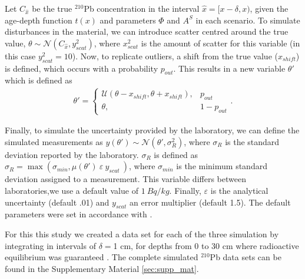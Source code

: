 \documentclass [10pt] {article}
\newcommand{\ac}{\color{red} }  %
\newcommand{\ma}{\color{blue} }  %
\begin{document}
	Let $C_{\hat{x}}$ be the true  $^{210}$Pb concentration in the interval $\hat{x}=[ x-\delta, x)$, given the age-depth function $t(x)$ and parameters $\Phi$ and $A^S$ in each scenario. 
To simulate disturbances in the material, we can introduce scatter centred around the true value, $\theta \sim \mathcal{N}\left(C_{\hat{x}},y^2_{scat}\right)$, where $x^2_{scat}$ is the amount of scatter for this variable (in this case $y^2_{scat}=10$). 
Now, to replicate outliers, a shift from the true value ($x_{shift}$) is defined, which occurs with a probability $p_{out}$. This results in a new variable $\theta'$ which is defined as
\begin{align}
	\theta' = \begin{cases}
			\mathcal{U}(\theta - x_{shift},\theta + x_{shift}), &  p_{out} \\
			\theta, & 1-p_{out}
		\end{cases}.
\end{align}

	Finally, to simulate the uncertainty provided by the laboratory, we can define the simulated measurements as  $y(\theta')\sim\mathcal{N}\left(\theta',\sigma_R^2\right)$, where $\sigma_R$ is the standard deviation reported by the laboratory. 
$\sigma_R$ is defined as $\sigma_R= \max \left(\sigma_{min}, \mu(\theta')~\varepsilon~y_{scat}~\right)$, where $\sigma_{min}$ is the minimum standard deviation assigned to a measurement. This variable differs between laboratories,we use a default value of $1~ Bq/kg$. 
Finally, $\varepsilon$ is the analytical uncertainty (default .01) and $y_{scat}$ an error multiplier (default 1.5).
The default parameters were set in accordance with \citet{Blaauw2018}.

For this this study we created a data set for each of the three simulation by integrating in intervals of $\delta =$1 cm, for depths from  0 to 30 cm where radioactive equilibrium was guaranteed \citep{Aquino2018}.
The complete simulated $^{210}$Pb data sets can be found in the Supplementary Material \ref{sec:supp_mat}.




\end{document}

